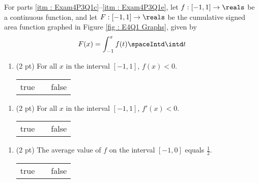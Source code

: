 


\noindent{}For parts \ref{itm : Exam4P3Q1c}--\ref{itm : Exam4P3Q1e}, let $f : [-1,1] \rightarrow \reals$ be a continuous function, and let $F : [-1,1] \rightarrow \reals$ be the cumulative signed area function graphed in Figure \ref{fig : E4Q1 Graphs}, given by
\begin{align*}
F(x)
=
\int_{-1}^{x} f(t) \spaceIntd \intd t
\end{align*}

\begin{enumerate}[resume,label=(\alph*)]
\item\label{itm : Exam4P3Q1c} (2 pt) For all $x$ in the interval $[-1,1]$, $f(x) < 0$.
\begin{center}
\begin{tabular}{c c c}
true	&	\hspace{1in}	&	false
\end{tabular}
\end{center}
\end{enumerate}




\begin{enumerate}[resume,label=(\alph*)]
\item\label{itm : Exam4P3Q1d} (2 pt) For all $x$ in the interval $[-1,1]$, $f'(x) < 0$.
\begin{center}
\begin{tabular}{c c c}
true	&	\hspace{1in}	&	false
\end{tabular}
\end{center}
\end{enumerate}




\begin{enumerate}[resume,label=(\alph*)]
\item\label{itm : Exam4P3Q1e} (2 pt) The average value of $f$ on the interval $[-1,0]$ equals $\frac{1}{2}$.
\begin{center}
\begin{tabular}{c c c}
true	&	\hspace{1in}	&	false
\end{tabular}
\end{center}
\end{enumerate}

